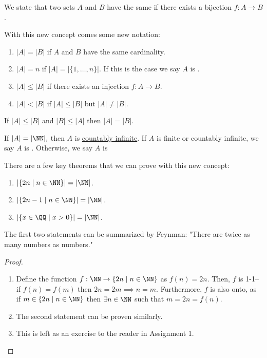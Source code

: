 \begin{definition}[Cardinality]
We state that two sets $A$ and $B$ have the same  if there exists a bijection $f:A\to B$.
\end{definition}
With this new concept comes some new notation:
\begin{enumerate}
    \item $|A| = |B|$ if $A$ and $B$ have the same cardinality. 
    \item $|A| = n$ if $|A| = |\{1,\dots, n\}|$. If this is the case we say $A$ is . 
    \item $|A| \leq |B|$ if there exists an injection $f:A\to B$. 
    \item $|A| < |B|$ if $|A|\leq |B|$ but $|A|\neq |B|$.
\end{enumerate}

\begin{theorem}
If $|A| \leq |B|$ and $|B| \leq |A|$ then $|A| = |B|$.
\end{theorem}

If $|A| = |\NN|,$ then $A$ is \underline{countably infinite}. If $A$ is finite or countably infinite, we say $A$ is . Otherwise, we say $A$ is 


\begin{example}
There are a few key theorems that we can prove with this new concept:
\begin{enumerate}
    \item $|\{2n \mid n\in \NN\}| = |\NN|$.
    \item $|\{2n-1 \mid n\in \NN\}| = |\NN|$.
    \item $|\{x\in \QQ \mid x>0\}| = |\NN|$.
\end{enumerate}
\end{example}
The first two statements can be summarized by Feynman: "There are twice as many numbers as numbers."\\
\begin{proof}~
\begin{enumerate}
    \item Define the function $f: \NN \to \{2n \mid n\in \NN\}$ as $f(n) = 2n$. Then, $f$ is 1-1-- if $f(n) = f(m)$ then $2n=2m \implies n=m$. Furthermore, $f$ is also onto, as if $m\in \{2n \mid n\in \NN\}$ then $\exists n\in \NN$ such that $m=2n=f(n)$. 
    \item The second statement can be proven similarly.
    \item This is left as an exercise to the reader in Assignment 1.
\end{enumerate}
\end{proof}